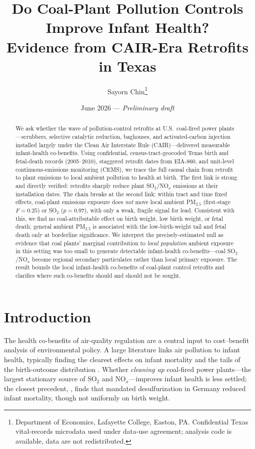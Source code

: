 \documentclass[12pt]{article}
\title{\textbf{Do Coal-Plant Pollution Controls Improve Infant Health?\\
Evidence from CAIR-Era Retrofits in Texas}}
\author{Sayorn Chin\thanks{Department of Economics, Lafayette College, Easton, PA.
Confidential Texas vital-records microdata used under data-use agreement; analysis
code is available, data are not redistributed.}}
\date{June 2026 --- \emph{Preliminary draft}}
\begin{document}
\maketitle

\begin{abstract}
\noindent We ask whether the wave of pollution-control retrofits at U.S.\ coal-fired
power plants---scrubbers, selective catalytic reduction, baghouses, and activated-carbon
injection installed largely under the Clean Air Interstate Rule (CAIR)---delivered
measurable infant-health co-benefits. Using confidential, census-tract-geocoded Texas
birth and fetal-death records (2005--2010), staggered retrofit dates from EIA-860, and
unit-level continuous-emissions monitoring (CEMS), we trace the full causal chain from
retrofit to plant emissions to local ambient pollution to health at birth. The first link
is strong and directly verified: retrofits sharply reduce plant SO$_2$/NO$_x$ emissions at
their installation dates. The chain breaks at the second link: within tract and time fixed
effects, coal-plant emissions exposure does \emph{not} move local ambient PM$_{2.5}$
(first-stage $F=0.25$) or SO$_2$ ($p=0.97$), with only a weak, fragile signal for lead.
Consistent with this, we find no coal-attributable effect on birth weight, low birth weight,
or fetal death; general ambient PM$_{2.5}$ is associated with the low-birth-weight tail and
fetal death only at borderline significance. We interpret the precisely-estimated null as
evidence that coal plants' marginal contribution to \emph{local population} ambient exposure
in this setting was too small to generate detectable infant-health co-benefits---coal
SO$_2$/NO$_x$ become regional secondary particulates rather than local primary exposure.
The result bounds the local infant-health co-benefits of coal-plant control retrofits and
clarifies where such co-benefits should and should not be sought.
\end{abstract}

\section{Introduction}
The health co-benefits of air-quality regulation are a central input to cost--benefit
analysis of environmental policy. A large literature links air pollution to infant health,
typically finding the clearest effects on infant mortality and the tails of the birth-outcome
distribution \citep{chay2003air,currie2009air,currie2011traffic,knittel2016caution}. Whether
\emph{cleaning up} coal-fired power plants---the largest stationary source of SO$_2$ and
NO$_x$---improves infant health is less settled; the closest precedent,
\citet{luechinger2014air}, finds that mandated desulfurization in Germany reduced infant
mortality, though not uniformly on birth weight.
\end{document}
